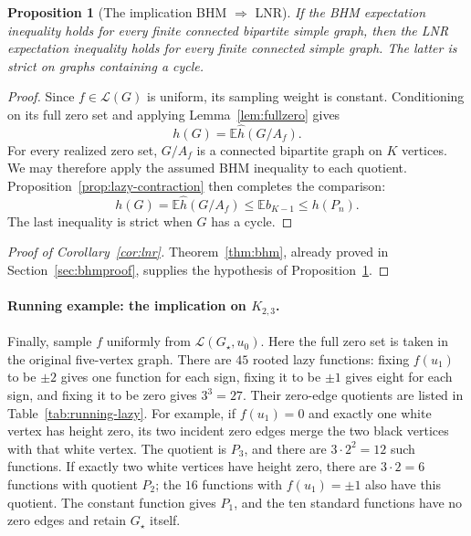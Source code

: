 \documentclass[11pt,reqno]{amsart}
\newtheorem{proposition}[theorem]{Proposition}
\theoremstyle{remark}
\numberwithin{equation}{section}
\newcommand{\E}{\mathbb E}
\newcommand{\LL}{\mathcal L}
\begin{document}
\begin{proposition}[The implication BHM $\Longrightarrow$ LNR]
\label{prop:implication}
If the BHM expectation inequality holds for every finite connected
bipartite simple graph, then the LNR expectation inequality holds for
every finite connected simple graph. The latter is strict on graphs
containing a cycle.
\end{proposition}

\begin{proof}
Since $f\in\LL(G)$ is uniform, its sampling weight is constant.
Conditioning on its full zero set and applying
Lemma~\ref{lem:fullzero} gives
\[
 h(G)=\E\widehat h(G/A_f).
\]
For every realized zero set, $G/A_f$ is a connected bipartite graph on
$K$ vertices. We may therefore apply the assumed BHM inequality to
each quotient. Proposition~\ref{prop:lazy-contraction} then completes
the comparison:
\begin{equation}\label{eq:implication}
 h(G)=\E\widehat h(G/A_f)
      \le\E b_{K-1}\le h(P_n).
\end{equation}
The last inequality is strict when $G$ has a cycle.
\end{proof}

\begin{proof}[Proof of Corollary~\ref{cor:lnr}]
Theorem~\ref{thm:bhm}, already proved in Section~\ref{sec:bhmproof},
supplies the hypothesis of Proposition~\ref{prop:implication}.
\end{proof}

\paragraph{Running example: the implication on $K_{2,3}$.}
Finally, sample $f$ uniformly from $\LL(G_\star,u_0)$.
Here the full zero set is taken in the original five-vertex graph.
There are $45$ rooted lazy functions: fixing $f(u_1)$ to be $\pm2$
gives one function for each sign, fixing it to be $\pm1$ gives
eight for each sign, and fixing it to be zero gives $3^3=27$.
Their zero-edge quotients are listed in Table~\ref{tab:running-lazy}.
For example, if $f(u_1)=0$ and exactly one white vertex has height
zero, its two incident zero edges merge the two black vertices with
that white vertex. The quotient is $P_3$, and there are
$3\cdot2^2=12$ such functions. If exactly two white vertices have
height zero, there are $3\cdot2=6$ functions with quotient $P_2$;
the $16$ functions with $f(u_1)=\pm1$ also have this quotient.
The constant function gives $P_1$, and the ten standard functions
have no zero edges and retain $G_\star$ itself.
\end{document}
